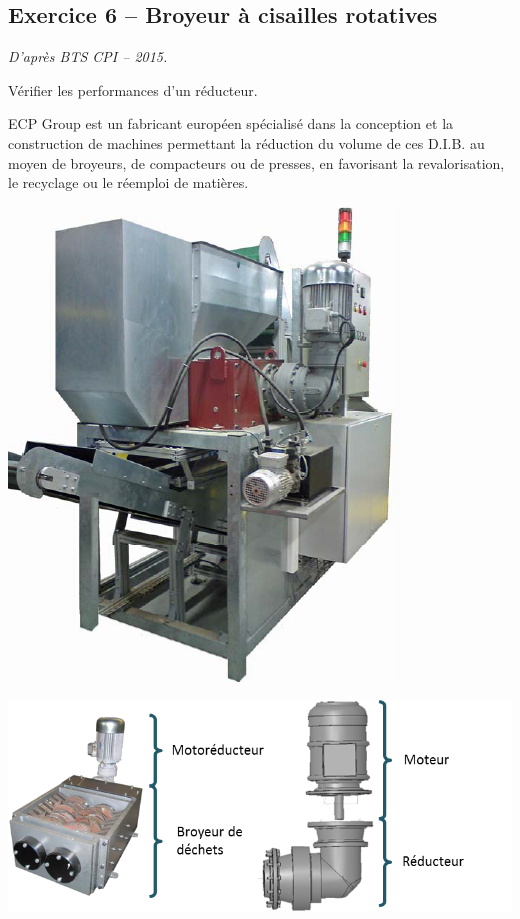 \documentclass[10pt,fleqn]{article} %
\begin{document}
\def\pathfig{images}

\vspace{4.5cm}
\pagestyle{fancy}
\thispagestyle{plain}

\def\columnseprulecolor{\color{ocre}}
\setlength{\columnseprule}{0.4pt} 

\def\pathfig{images}

\ifprof
\else
\begin{multicols}{2}
\fi


\section*{Exercice 6 -- {Broyeur à cisailles rotatives}}
\setcounter{exo}{0}
\textit{D'après BTS CPI -- 2015.}

\begin{obj}
Vérifier les performances d'un réducteur.
\end{obj}
ECP Group est un fabricant européen spécialisé
dans la conception et la construction de machines
permettant la réduction du volume de ces D.I.B. au
moyen de broyeurs, de compacteurs ou de presses,
en favorisant la revalorisation, le recyclage ou le réemploi
de matières.

\begin{center}
\includegraphics[width=.6\linewidth]{images/broyeur_01}
\end{center}

\begin{center}
\includegraphics[width=\linewidth]{images/broyeur_04}
\end{center}


\end{multicols}
\end{document}
